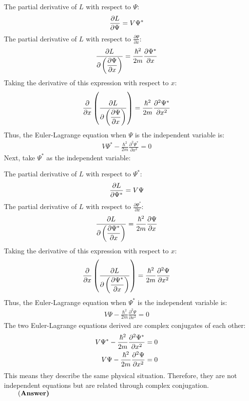 \begin{enumerate}
    The partial derivative of $L$ with respect to $\Psi$:
    \begin{align}
        \frac{\partial L}{\partial \Psi} = V\Psi^*\notag
    \end{align}
    The partial derivative of $L$ with respect to $\displaystyle\frac{\partial \Psi}{\partial x}$:
    \begin{align}
        \frac{\partial L}{\displaystyle\partial \left(\frac{\partial \Psi}{\partial x}\right)} = \frac{\hbar^2}{2m} \frac{\partial \Psi^*}{\partial x}\notag
    \end{align}
    Taking the derivative of this expression with respect to $x$:
    \begin{align}
        \frac{\partial}{\partial x} \left( \frac{\partial L}{\displaystyle\partial \left(\frac{\partial \Psi}{\partial x}\right)} \right) = \frac{\hbar^2}{2m} \frac{\partial^2 \Psi^*}{\partial x^2}\notag
    \end{align}
    Thus, the Euler-Lagrange equation when $\Psi$ is the independent variable is:
    \begin{align}
        V\Psi^* - \frac{\hbar^2}{2m} \frac{\partial^2 \Psi^*}{\partial x^2} = 0
    \end{align}
    Next, take $\Psi^*$ as the independent variable:
    
    The partial derivative of $L$ with respect to $\Psi^*$:
    \begin{align}
        \frac{\partial L}{\partial \Psi^*} = V\Psi\notag
    \end{align}
    The partial derivative of $L$ with respect to $\displaystyle\frac{\partial \Psi^*}{\partial x}$:
    \begin{align}
        \frac{\partial L}{\displaystyle\partial \left(\frac{\partial \Psi^*}{\partial x}\right)} = \frac{\hbar^2}{2m} \frac{\partial \Psi}{\partial x}\notag
    \end{align}
    Taking the derivative of this expression with respect to $x$:
    \begin{align}
        \frac{\partial}{\partial x} \left( \frac{\partial L}{\displaystyle\partial \left(\frac{\partial \Psi^*}{\partial x}\right)} \right) = \frac{\hbar^2}{2m} \frac{\partial^2 \Psi}{\partial x^2}\notag
    \end{align}
    Thus, the Euler-Lagrange equation when $\Psi^*$ is the independent variable is:
    \begin{align}
        V\Psi - \frac{\hbar^2}{2m} \frac{\partial^2 \Psi}{\partial x^2} = 0
    \end{align}
    The two Euler-Lagrange equations derived are complex conjugates of each other:
    \begin{align}
        V\Psi^* - \frac{\hbar^2}{2m} \frac{\partial^2 \Psi^*}{\partial x^2} = 0 \notag\\
        V\Psi - \frac{\hbar^2}{2m} \frac{\partial^2 \Psi}{\partial x^2} = 0\notag
    \end{align}
    This means they describe the same physical situation. Therefore, they are not independent equations but are related through complex conjugation.$\qquad\text{(\bf Answer)}$
\end{enumerate}